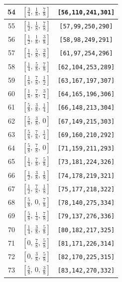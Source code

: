 \documentclass[fleqn,8pt]{jsarticle}
\begin{document}
\begin{longtable}{ccc}
54 & $\left[ \frac{3}{4},\, \frac{1}{8},\, \frac{7}{8} \right]$ & {\tt [56,110,241,301]} \\ \hline
55 & $\left[ \frac{1}{2},\, \frac{1}{8},\, \frac{7}{8} \right]$ & {\tt [57,99,250,290]} \\ \hline
56 & $\left[ \frac{1}{2},\, \frac{1}{8},\, \frac{3}{8} \right]$ & {\tt [58,98,249,291]} \\ \hline
57 & $\left[ \frac{1}{4},\, \frac{5}{8},\, \frac{3}{8} \right]$ & {\tt [61,97,254,296]} \\ \hline
58 & $\left[ \frac{1}{4},\, \frac{5}{8},\, \frac{7}{8} \right]$ & {\tt [62,104,253,289]} \\ \hline
59 & $\left[ \frac{1}{8},\, \frac{7}{8},\, \frac{1}{2} \right]$ & {\tt [63,167,197,307]} \\ \hline
60 & $\left[ \frac{1}{8},\, \frac{7}{8},\, \frac{3}{4} \right]$ & {\tt [64,165,196,306]} \\ \hline
61 & $\left[ \frac{5}{8},\, \frac{3}{8},\, \frac{1}{4} \right]$ & {\tt [66,148,213,304]} \\ \hline
62 & $\left[ \frac{5}{8},\, \frac{3}{8},\, 0 \right]$ & {\tt [67,149,215,303]} \\ \hline
63 & $\left[ \frac{5}{8},\, \frac{7}{8},\, \frac{1}{4} \right]$ & {\tt [69,160,210,292]} \\ \hline
64 & $\left[ \frac{5}{8},\, \frac{7}{8},\, 0 \right]$ & {\tt [71,159,211,293]} \\ \hline
65 & $\left[ \frac{1}{4},\, \frac{7}{8},\, \frac{5}{8} \right]$ & {\tt [73,181,224,326]} \\ \hline
66 & $\left[ \frac{1}{2},\, \frac{3}{8},\, \frac{1}{8} \right]$ & {\tt [74,178,219,321]} \\ \hline
67 & $\left[ \frac{1}{2},\, \frac{7}{8},\, \frac{1}{8} \right]$ & {\tt [75,177,218,322]} \\ \hline
68 & $\left[ \frac{5}{8},\, 0,\, \frac{7}{8} \right]$ & {\tt [78,140,275,334]} \\ \hline
69 & $\left[ \frac{5}{8},\, \frac{1}{4},\, \frac{7}{8} \right]$ & {\tt [79,137,276,336]} \\ \hline
70 & $\left[ \frac{1}{4},\, \frac{3}{8},\, \frac{5}{8} \right]$ & {\tt [80,182,217,325]} \\ \hline
71 & $\left[ 0,\, \frac{7}{8},\, \frac{5}{8} \right]$ & {\tt [81,171,226,314]} \\ \hline
72 & $\left[ 0,\, \frac{3}{8},\, \frac{5}{8} \right]$ & {\tt [82,170,225,315]} \\ \hline
73 & $\left[ \frac{5}{8},\, 0,\, \frac{3}{8} \right]$ & {\tt [83,142,270,332]} \\ \hline

\end{longtable}
\end{document}

